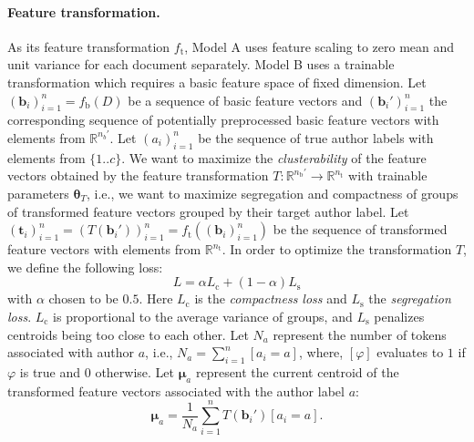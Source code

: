 \documentclass[10pt, a4paper]{article}
\newcommand{\vect}[1]{\bm{#1}}
\begin{document}
\paragraph{Feature transformation.}
As its feature transformation $f_\mathrm{t}$, Model A uses feature scaling to zero mean and unit variance for each document separately. Model B uses a trainable transformation which requires a basic feature space of fixed dimension. Let $(\vect{b}_i)_{i=1}^n = f_\mathrm{b}(D)$ be a sequence of basic feature vectors and $(\vect{b}_i')_{i=1}^n$ the corresponding sequence of potentially preprocessed basic feature vectors with elements from $\mathbb{R}^{n_{b}'}$. Let $(a_i)_{i=1}^n$ be the sequence of true author labels with elements from $\{1..c\}$. We want to maximize the \emph{clusterability} of the feature vectors obtained by the feature transformation $T:\mathbb{R}^{n_\mathrm{b}'}\rightarrow\mathbb{R}^{n_\mathrm{t}}$ with trainable parameters $\vect{\theta}_T$, i.e., we want to maximize segregation and compactness of groups of transformed feature vectors grouped by their target author label. Let $(\vect{t}_i)_{i=1}^n = (T(\boldsymbol{b}_i'))_{i=1}^n = f_\mathrm{t}((\vect{b}_i)_{i=1}^n)$ be the sequence of transformed feature vectors with elements from $\mathbb{R}^{n_\mathrm{t}}$. In order to optimize the transformation $T$, we define the following loss:
\begin{equation}
	L = \alpha L_\mathrm{c} + (1-\alpha)L_\mathrm{s}
\end{equation}
with $\alpha$ chosen to be $0.5$. Here $L_\mathrm{c}$ is the \emph{compactness loss} and $L_\mathrm{s}$ the \emph{segregation loss}. $L_\mathrm{c}$ is proportional to the average variance of groups, and $L_\mathrm{s}$ penalizes centroids being too close to each other. Let $N_a$ represent the number of tokens associated with author $a$, i.e., $N_a = \sum_{i=1}^n[a_i=a]$, where, $[\varphi]$ evaluates to $1$ if $\varphi$ is true and $0$ otherwise.
Let $\vect{\mu}_a$ represent the current centroid of the transformed feature vectors associated with the author label $a$:
\begin{equation}
\vect{\mu}_a = \frac{1}{N_a}\sum_{i=1}^n T(\vect{b}_i')[a_i=a].
\end{equation}	
\end{document}
